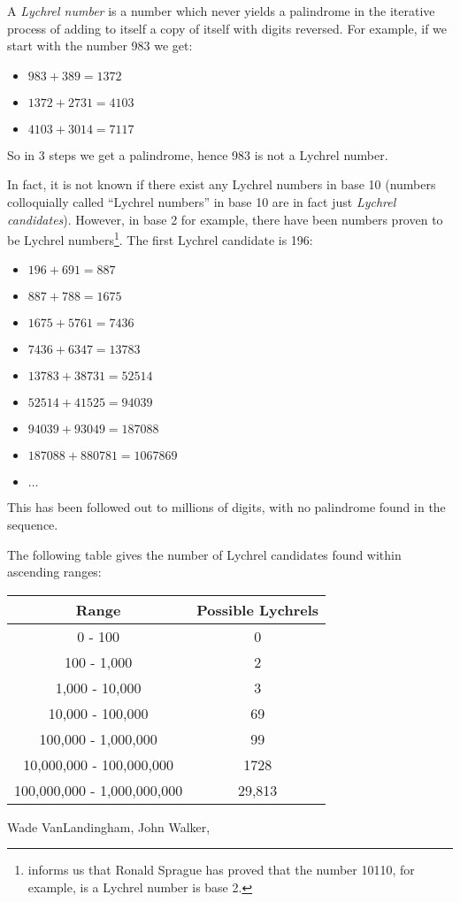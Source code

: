 \documentclass[12pt]{article}
\begin{document}
 
A \emph{Lychrel number} is a number which never yields a palindrome in the iterative process of adding to itself a copy of itself with digits reversed.  For example, if we start with the number 983 we get:

\begin{itemize}
\item $983+389 = 1372$
\item $1372+2731 = 4103$
\item $4103+3014 = 7117$
\end{itemize}

So in 3 steps we get a palindrome, hence 983 is not a Lychrel number.  

In fact, it is not known if there exist any Lychrel numbers in base 10 (numbers colloquially called ``Lychrel numbers'' in base 10 are in fact just \emph{Lychrel candidates}).  However, in base 2 for example, there have been numbers proven to be Lychrel numbers\footnote{\cite{walker} informs us that Ronald Sprague has proved that the number 10110, for example, is a Lychrel number is base 2.}.  The first Lychrel candidate is 196:

\begin{itemize}
\item $196+691 = 887$
\item $887+788 = 1675$
\item $1675+5761 = 7436$
\item $7436+6347 = 13783$
\item $13783+38731 = 52514$
\item $52514+41525 = 94039$
\item $94039+93049 = 187088$
\item $187088+880781 = 1067869$
\item $\ldots$
\end{itemize}

This has been followed out to millions of digits, with no palindrome found in the sequence.

The following table gives the number of Lychrel candidates found within ascending ranges:

\begin{center}
\begin{tabular}{cc}
Range & Possible Lychrels \\
\hline
0 - 100 & 0 \\
100 - 1,000 & 2 \\
1,000 - 10,000 & 3 \\
10,000 - 100,000 & 69 \\
100,000 - 1,000,000 & 99 \\
10,000,000 - 100,000,000 & 1728 \\
100,000,000 - 1,000,000,000 & 29,813 \\
\end{tabular}
\end{center}

\begin{thebibliography}{9}

 Wade VanLandingham, 
 John Walker, 

\end{thebibliography}
\end{document}
